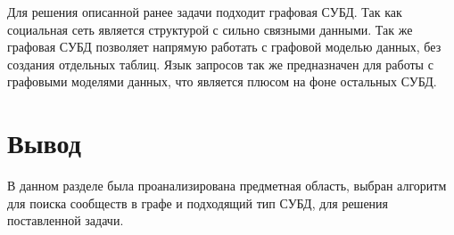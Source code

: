 Для решения описанной ранее задачи подходит графовая СУБД. Так как социальная сеть является структурой с сильно связными данными. Так же графовая СУБД позволяет напрямую работать с графовой моделью данных, без создания отдельных таблиц. Язык запросов так же предназначен для работы с графовыми моделями данных, что является плюсом на фоне остальных СУБД.


\section*{Вывод}

В данном разделе была проанализирована предметная область, выбран алгоритм для поиска сообществ в графе и подходящий тип СУБД, для решения поставленной задачи.
